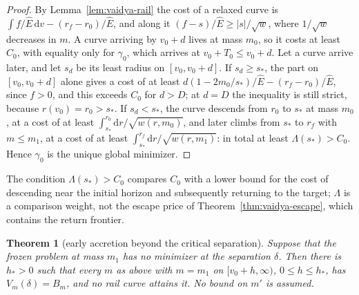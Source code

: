 \documentclass[aip,jmp,amsmath,amssymb,reprint]{revtex4-2}
\newcommand{\Ehat}{\hat E}
\newcommand{\dd}{\mathrm{d}}
\theoremstyle{plain}
\newtheorem{theorem}{Theorem}
\theoremstyle{definition}
\begin{document}
\begin{proof}
By Lemma~\ref{lem:vaidya-rail} the cost of a relaxed curve is $\int f/\Ehat\,\dd v-(r_f-r_0)/\Ehat$, and along
it $(f-s)/\Ehat\ge|s|/\sqrt w$, where $1/\sqrt w$ decreases in $m$. A curve arriving by $v_0+d$ lives at
mass $m_0$, so it costs at least $C_0$, with equality only for $\gamma_0$, which arrives at $v_0+T_0\le v_0+d$.
Let a curve arrive later, and let $s_d$ be its least radius on $[v_0,v_0+d]$. If $s_d\ge s_*$, the part
on $[v_0,v_0+d]$ alone gives a cost of at least $d(1-2m_0/s_*)/\Ehat-(r_f-r_0)/\Ehat$, since $f>0$, and this exceeds
$C_0$ for $d>D$; at $d=D$ the inequality is still strict, because $r(v_0)=r_0>s_*$. If $s_d<s_*$, the curve
descends from $r_0$ to $s_*$ at mass $m_0$, at a cost of at least $\int_{s_*}^{r_0}\dd r/\sqrt{w(r,m_0)}$, and later
climbs from $s_*$ to $r_f$ with $m\le m_1$, at a cost of at least $\int_{s_*}^{r_f}\dd r/\sqrt{w(r,m_1)}$: in total
at least $\Lambda(s_*)>C_0$. Hence $\gamma_0$ is the unique global minimizer.
\end{proof}

The condition $\Lambda(s_*)>C_0$ compares $C_0$ with a lower bound for the cost of descending near the
initial horizon and subsequently returning to the target; $\Lambda$ is a comparison weight, not the escape
price of Theorem~\ref{thm:vaidya-escape}, which contains the return frontier.

\begin{theorem}[early accretion beyond the critical separation]\label{thm:vaidya-early}
Suppose that the frozen problem at mass $m_1$ has no minimizer at the separation $\delta$. Then there is
$h_*>0$ such that every $m$ as above with $m=m_1$ on $[v_0+h,\infty)$, $0\le h\le h_*$, has $V_m(\delta)=B_m$, and no rail
curve attains it. No bound on $m'$ is assumed.
\end{theorem}
\end{document}

